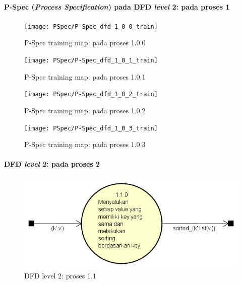 \paragraph{P-Spec (\textit{Process Specification}) pada DFD \textit{level} 2: pada proses 1}
\begin{figure}[H]
	\centering
	\texttt{[image: PSpec/P-Spec\_dfd\_1\_0\_0\_train]}
	\caption[P-Spec proses 1.0.0]{P-Spec training map: pada proses 1.0.0}
	\label{fig:P-Spec training: pada proses 1.0.0}
\end{figure}

\begin{figure}[H]
	\centering
	\texttt{[image: PSpec/P-Spec\_dfd\_1\_0\_1\_train]}
	\caption[P-Spec proses 1.0.1]{P-Spec training map: pada proses 1.0.1}
	\label{fig:P-Spec training: pada proses 1.0.1}
\end{figure}

\begin{figure}[H]
	\centering
	\texttt{[image: PSpec/P-Spec\_dfd\_1\_0\_2\_train]}
	\caption[P-Spec proses 1.0.2]{P-Spec training map: pada proses 1.0.2}
	\label{fig:P-Spec training: pada proses 1.0.2}
\end{figure}

\begin{figure}[H]
	\centering
	\texttt{[image: PSpec/P-Spec\_dfd\_1\_0\_3\_train]}
	\caption[P-Spec proses 1.0.3]{P-Spec training map: pada proses 1.0.3}
	\label{fig:P-Spec training: pada proses 1.0.3}
\end{figure}

\paragraph{DFD \textit{level} 2: pada proses 2}
\begin{figure}[H]
	\centering
	\includegraphics[scale=0.65]{Diagram/DFD_1_2_Training_Test_SS}
	\caption[DFD level 2: proses 1.1]{DFD level 2: proses 1.1}
	\label{fig:DFD level 2: proses 1.1}
\end{figure}

